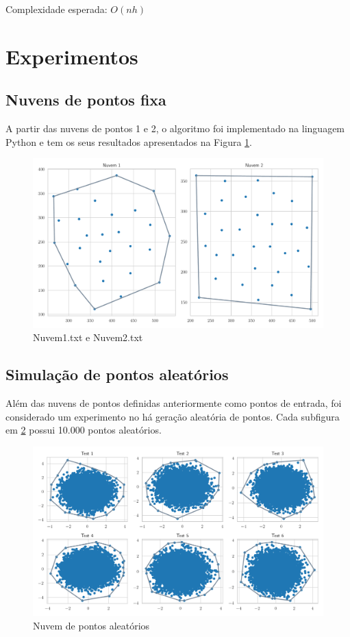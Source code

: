 \documentclass{article}
\begin{document}
\noindent Complexidade esperada: $O(nh)$

\section{Experimentos}

\subsection{Nuvens de pontos fixa}

A partir das nuvens de pontos 1 e 2, o algoritmo foi implementado na linguagem Python e tem os seus resultados apresentados na Figura \ref{fig:nuvens}.

\begin{figure}[H]
  \centering
  \includegraphics[scale=0.4]{nuvens.pdf}
  \caption{Nuvem1.txt e Nuvem2.txt}
  \label{fig:nuvens}  
\end{figure}

\subsection{Simulação de pontos aleatórios}

Além das nuvens de pontos definidas anteriormente como pontos de entrada, foi considerado um experimento no há geração aleatória de pontos. Cada subfigura em \ref{fig:aleatoria} possui 10.000 pontos aleatórios. 

\begin{figure}[H]
  \centering
  \includegraphics[scale=0.5]{random_test.png}
  \caption{Nuvem de pontos aleatórios}
  \label{fig:aleatoria}  
\end{figure}
\end{document}
